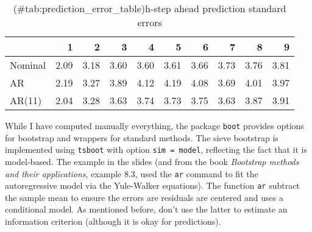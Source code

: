 \documentclass[]{book}
\newenvironment{Shaded}{\begin{snugshade}}{\end{snugshade}}
\newcommand{\KeywordTok}[1]{\textcolor[rgb]{0.13,0.29,0.53}{\textbf{#1}}}
\newcommand{\DataTypeTok}[1]{\textcolor[rgb]{0.13,0.29,0.53}{#1}}
\newcommand{\DecValTok}[1]{\textcolor[rgb]{0.00,0.00,0.81}{#1}}
\newcommand{\StringTok}[1]{\textcolor[rgb]{0.31,0.60,0.02}{#1}}
\newcommand{\OperatorTok}[1]{\textcolor[rgb]{0.81,0.36,0.00}{\textbf{#1}}}
\newcommand{\NormalTok}[1]{#1}
\begin{document}
\begin{Shaded}
\end{Shaded}

\begin{table}

\caption{(\#tab:prediction_error_table)h-step ahead prediction standard errors}
\centering
\begin{tabular}[t]{l|r|r|r|r|r|r|r|r|r}
\hline
  & 1 & 2 & 3 & 4 & 5 & 6 & 7 & 8 & 9\\
\hline
Nominal & 2.09 & 3.18 & 3.60 & 3.60 & 3.61 & 3.66 & 3.73 & 3.76 & 3.81\\
\hline
AR & 2.19 & 3.27 & 3.89 & 4.12 & 4.19 & 4.08 & 3.69 & 4.01 & 3.97\\
\hline
AR(11) & 2.04 & 3.28 & 3.63 & 3.74 & 3.73 & 3.75 & 3.63 & 3.87 & 3.91\\
\hline
\end{tabular}
\end{table}

While I have computed manually everything, the package \texttt{boot}
provides options for bootstrap and wrappers for standard methods. The
sieve bootstrap is implemented using \texttt{tsboot} with option
\texttt{sim\ =\ model}, reflecting the fact that it is model-based. The
example in the slides (and from the book \emph{Bootstrap methods and
their applications}, example 8.3, used the \texttt{ar} command to fit
the autoregressive model via the Yule-Walker equations). The function
\texttt{ar} subtract the sample mean to ensure the errors are residuals
are centered and uses a conditional model. As mentioned before, don't
use the latter to estimate an information criterion (although it is okay
for predictions).
\end{document}
